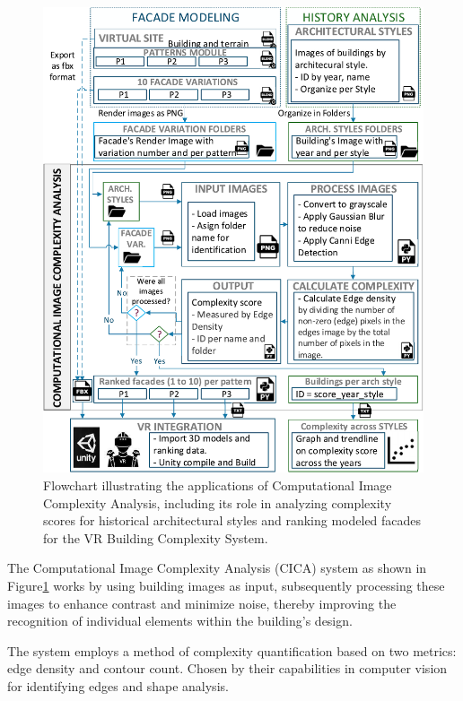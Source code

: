     \begin{figure}[!htb]
      \centering
      \includegraphics[width= \linewidth, trim=0 0 0 0, clip]{Images/ImageComplexityAnalysisFlowchart}
      \caption{Flowchart illustrating the applications of Computational Image Complexity Analysis, including its role in analyzing complexity scores for historical architectural styles and ranking modeled facades for the VR Building Complexity System.}
      \label{fig:ImageComplexityAnalysisFlowchart}
    \end{figure}

The Computational Image Complexity Analysis (CICA) system as shown in Figure\ref{fig:ImageComplexityAnalysisFlowchart} works by using building images as input, subsequently processing these images to enhance contrast and minimize noise, thereby improving the recognition of individual elements within the building's design.

The system employs a method of complexity quantification based on two metrics: edge density and contour count.
Chosen by their capabilities in computer vision for identifying edges and shape analysis.


